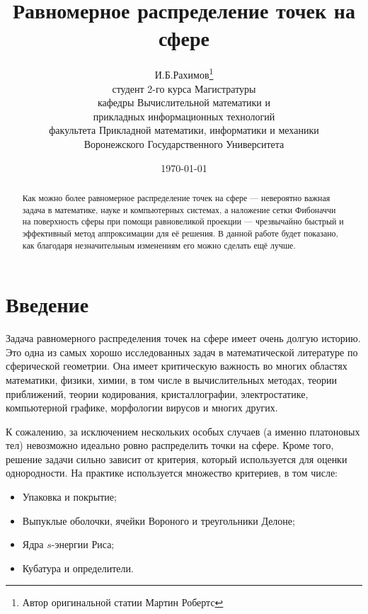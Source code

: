 \documentclass[12pt, a4paper]{article}
\title
{
	Равномерное распределение точек на сфере
}
\author
{
	И.Б.Рахимов\thanks{Автор оригинальной статии Мартин Робертс} \\
	студент 2-го курса Магистратуры  \\
	кафедры Вычислительной математики и \\
	прикладных информационных технологий \\
	факультета Прикладной математики, информатики и механики \\
	Воронежского Государственного Университета
}
\date
{
	\today
}
\begin{document}
\maketitle
\thispagestyle{empty} %

\newpage

\begin{abstract}
Как можно более равномерное распределение точек на сфере — невероятно важная задача в математике, науке и компьютерных системах, а наложение сетки Фибоначчи на поверхность сферы при помощи равновеликой проекции — чрезвычайно быстрый и эффективный метод аппроксимации для её решения. В данной работе будет показано, как благодаря незначительным изменениям его можно сделать ещё лучше.
\end{abstract}

\newpage

\tableofcontents


\newpage

\section*{Введение}

Задача равномерного распределения точек на сфере имеет очень долгую историю. Это одна из самых хорошо исследованных задач в математической литературе по сферической геометрии. Она имеет критическую важность во многих областях математики, физики, химии, в том числе в вычислительных методах, теории приближений, теории кодирования, кристаллографии, электростатике, компьютерной графике, морфологии вирусов и многих других.

К сожалению, за исключением нескольких особых случаев (а именно платоновых тел) невозможно идеально ровно распределить точки на сфере. Кроме того, решение задачи сильно зависит от критерия, который используется для оценки однородности. На практике используется множество критериев, в том числе:

\begin{itemize}
	\item Упаковка и покрытие;
	\item Выпуклые оболочки, ячейки Вороного и треугольники Делоне;
	\item Ядра $s$-энергии Риса;
	\item Кубатура и определители.
\end{itemize}
\end{document}
